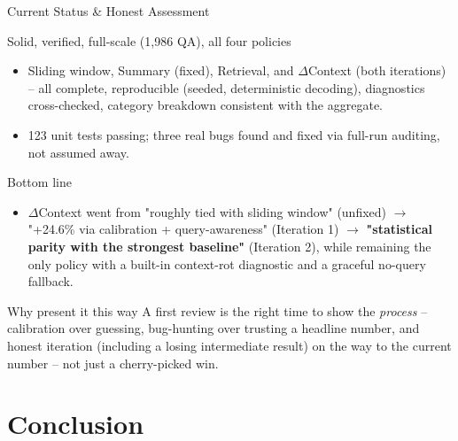 \documentclass[aspectratio=169]{beamer}
\begin{document}
\begin{frame}{Current Status \& Honest Assessment}
    \begin{block}{Solid, verified, full-scale (1{,}986 QA), all four policies}
        \begin{itemize}
            \item Sliding window, Summary (fixed), Retrieval, and $\Delta$Context (both iterations) -- all complete, reproducible (seeded, deterministic decoding), diagnostics cross-checked, category breakdown consistent with the aggregate.
            \item 123 unit tests passing; three real bugs found and fixed via full-run auditing, not assumed away.
        \end{itemize}
    \end{block}
    \begin{block}{Bottom line}
        \begin{itemize}
            \item $\Delta$Context went from "roughly tied with sliding window" (unfixed) $\to$ "+24.6\% via calibration + query-awareness" (Iteration 1) $\to$ \textbf{"statistical parity with the strongest baseline"} (Iteration 2), while remaining the only policy with a built-in context-rot diagnostic and a graceful no-query fallback.
        \end{itemize}
    \end{block}
    \begin{alertblock}{Why present it this way}
        A first review is the right time to show the \emph{process} -- calibration over guessing, bug-hunting over trusting a headline number, and honest iteration (including a losing intermediate result) on the way to the current number -- not just a cherry-picked win.
    \end{alertblock}
\end{frame}

\section{Conclusion}
\end{document}
